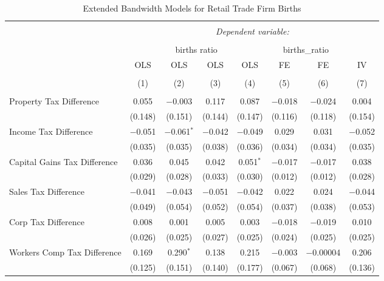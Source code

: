 
\begin{table}[!htbp] \centering 
  \caption{Extended Bandwidth Models for  Retail Trade Firm Births} 
  \label{} 
\begin{tabular}{@{\extracolsep{5pt}}lccccccc} 
\\[-1.8ex]\hline 
\hline \\[-1.8ex] 
 & \multicolumn{7}{c}{\textit{Dependent variable:}} \\ 
\cline{2-8} 
\\[-1.8ex] & \multicolumn{4}{c}{births ratio} & \multicolumn{2}{c}{births\_ratio} &   \\ 
 & OLS & OLS & OLS & OLS & FE & FE & IV \\ 
\\[-1.8ex] & (1) & (2) & (3) & (4) & (5) & (6) & (7)\\ 
\hline \\[-1.8ex] 
 Property Tax Difference & 0.055 & $-$0.003 & 0.117 & 0.087 & $-$0.018 & $-$0.024 & 0.004 \\ 
  & (0.148) & (0.151) & (0.144) & (0.147) & (0.116) & (0.118) & (0.154) \\ 
  Income Tax Difference & $-$0.051 & $-$0.061$^{*}$ & $-$0.042 & $-$0.049 & 0.029 & 0.031 & $-$0.052 \\ 
  & (0.035) & (0.035) & (0.038) & (0.036) & (0.034) & (0.034) & (0.035) \\ 
  Capital Gains Tax Difference & 0.036 & 0.045 & 0.042 & 0.051$^{*}$ & $-$0.017 & $-$0.017 & 0.038 \\ 
  & (0.029) & (0.028) & (0.033) & (0.030) & (0.012) & (0.012) & (0.028) \\ 
  Sales Tax Difference & $-$0.041 & $-$0.043 & $-$0.051 & $-$0.042 & 0.022 & 0.024 & $-$0.044 \\ 
  & (0.049) & (0.054) & (0.052) & (0.054) & (0.037) & (0.038) & (0.053) \\ 
  Corp Tax Difference & 0.008 & 0.001 & 0.005 & 0.003 & $-$0.018 & $-$0.019 & 0.010 \\ 
  & (0.026) & (0.025) & (0.027) & (0.025) & (0.024) & (0.025) & (0.025) \\ 
  Workers Comp Tax Difference & 0.169 & 0.290$^{*}$ & 0.138 & 0.215 & $-$0.003 & $-$0.00004 & 0.206 \\ 
  & (0.125) & (0.151) & (0.140) & (0.177) & (0.067) & (0.068) & (0.136) \\ 

\end{tabular}
\end{table}
